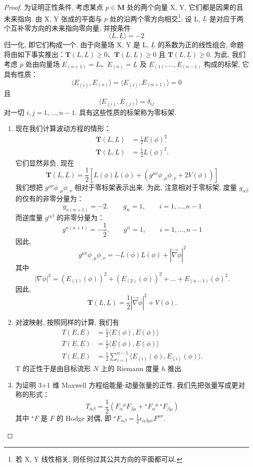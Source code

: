\begin{proof}
为证明正性条件, 考虑某点 $p \in \mathbf{M}$ 处的两个向量 X, Y, 它们都是因果的且未来指向. 由 X, Y 张成的平面与 $p$ 处的沿两个零方向相交\footnote{若 X, Y 线性相关, 则任何过其公共方向的平面都可以. }. 设 L, $\underline{L}$ 是对应于两个互补零方向的未来指向零向量, 并按条件
\[
\langle L, \underline{L}\rangle = -2
\]
归一化, 即它们构成一个. 由于向量场 X, Y 是 L, $\underline{L}$ 的系数为正的线性组合, 命题将由如下事实推出：$\mathbf{T}(L, L) \geq 0$、$\mathbf{T}(\underline{L}, \underline{L}) \geq 0$ 且 $\mathbf{T}(L, \underline{L}) \geq 0$. 为此, 我们考虑 $p$ 处由向量场 $E_{(n+1)} = L$、$E_{(n)} = \underline{L}$ 及 $E_{(1)}, \ldots, E_{(n-1)}$ 构成的标架, 它具有性质：
\[
\langle E_{(i)}, E_{(n)}\rangle = \langle E_{(i)}, E_{(n+1)}\rangle = 0
\]
且
\[
\langle E_{(i)}, E_{(j)}\rangle = \delta_{ij}
\]
对一切 $i, j = 1, \ldots, n-1$. 具有这些性质的标架称为零标架. 

\begin{enumerate}
\item 现在我们计算波动方程的情形：
\[
\begin{aligned}
\mathbf{T}(L, L) &= \frac{1}{2}E(\phi)^2\\
\mathbf{T}(\underline{L}, \underline{L}) &= \frac{1}{2}\underline{L}(\phi)^2.
\end{aligned}
\]
它们显然非负. 现在
\[
\mathbf{T}(L, \underline{L}) = \frac{1}{2}\left[L(\phi)\underline{L}(\phi) + \left(g^{\mu\nu}\phi_{, \mu}\phi_{, \nu} + 2V(\phi)\right)\right]
\]
我们想把 $g^{\mu\nu}\phi_{, \mu}\phi_{, \nu}$ 相对于零标架表示出来. 为此, 注意相对于零标架, 度量 $g_{\alpha\beta}$ 的仅有的非零分量为：
\[
g_{n(n+1)} = -2, \qquad g_{ii} = 1, \qquad i = 1, \dots, n-1
\]
而逆度量 $g^{\alpha\beta}$ 的非零分量为：
\[
g^{n(n+1)} = -\frac{1}{2}, \qquad g^{ii} = 1, \qquad i = 1, \ldots, n-1
\]
因此, 
\[
g^{\mu\nu}\phi_{, \mu}\phi_{, \nu} = -L(\phi)\underline{L}(\phi) + |\vec{\nabla}\phi|^2
\]
其中
\[
|\nabla\phi|^2 = (E_{(1)}(\phi))^2 + (E_{(2)}(\phi))^2 + \dots + E_{(n-1)}(\phi)^2.
\]
因此, 
\[
\mathbf{T}(L, \underline{L}) = \frac{1}{2}|\vec{\nabla}\phi|^2 + V(\phi).
\]
\item 对波映射, 按照同样的计算, 我们有
\[
\begin{aligned}
T(E, E) &= \frac{1}{2}\langle E(\phi), E(\phi)\rangle\\
T(\underline{E}, \underline{E}) &= \frac{1}{2}\langle\underline{E}(\phi), \underline{E}(\phi)\rangle\\
T(E, \underline{E}) &= \frac{1}{2}\sum_{i=1}^{n-1}\langle E_{(i)}(\phi), E_{(i)}(\phi)\rangle.
\end{aligned}
\]
T 的正性于是由目标流形 $N$ 上的 Riemann 度量 $h$ 推出. 
\item 为证明 3+1 维 Maxwell 方程组能量-动量张量的正性, 我们先把张量写成更对称的形式：
\begin{equation}
T_{\alpha\beta} = \frac{1}{2}\left(F_\alpha{}^\mu F_{\beta\mu} + {}^\star F_\alpha{}^\mu\, {}^\star F_{\beta\mu}\right)\label{eq:c1-65}
\end{equation}
其中 ${}^\star F$ 是 $F$ 的 Hodge 对偶, 即 ${}^\star F_{\alpha\beta} = \textstyle\frac{1}{2}\epsilon_{\alpha\beta\mu\nu}F^{\mu\nu}$. 


\end{enumerate}
\end{proof}
